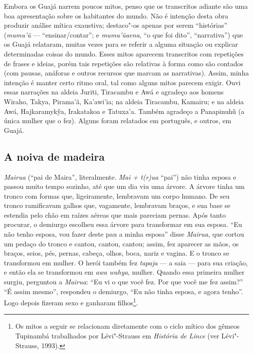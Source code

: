 Embora os Guajá narrem poucos mitos, penso que os transcritos adiante
são uma boa apresentação sobre os habitantes do mundo. Não é intenção
desta obra produzir análise mítica exaustiva; destaco"-os apenas por
serem ``histórias'' (\emph{mumu'ũ} --- ``ensinar/contar''; e
\emph{mumu'ũaena}, ``o que foi dito'', ``narrativa'') que os Guajá
relataram, muitas vezes para se referir a alguma situação ou explicar
determinadas coisas do mundo. Esses mitos aparecem transcritos com
repetições de frases e ideias, porém tais repetições são relativas à
forma como são contados (com pausas, anáforas e outros recursos que
marcam as narrativas). Assim, minha intenção é manter certo ritmo oral,
tal como alguns mitos parecem exigir. Ouvi essas narrações na aldeia
Juriti, Tiracambu e Awá e agradeço aos homens Wiraho, Takya, Pirama'ã,
Ka'awi'ia; na aldeia Tiracambu, Kamairu; e na aldeia Awá,
Hajkaramykỹa, Irakatakoa e Tatuxa'a. Também agradeço a Panapinuhũ (a
única mulher que o fez). Alguns foram relatados em português, e outros,
em Guajá.

\subsection{A noiva de madeira}

\forceindent\emph{Mairua} (``pai de Maira'', literalmente. \emph{Mai + t(r)ua} ``pai'')
não tinha esposa e passou muito tempo sozinho, até que um dia viu uma
árvore. A árvore tinha um tronco com formas que, ligeiramente, lembravam
um corpo humano. De seu tronco ramificavam galhos que, vagamente,
lembravam braços, e sua base se estendia pelo chão em raízes aéreas que
mais pareciam pernas. Após tanto procurar, o demiurgo escolheu essa
árvore para transformar em sua esposa. ``Eu não tenho esposa, vou fazer
deste pau a minha esposa'' disse \emph{Mairua}, que cortou um pedaço do
tronco e cantou, cantou, cantou; assim, fez aparecer as mãos, os braços,
seios, pés, pernas, cabeça, olhos, boca, nariz e vagina. E o tronco se
transformou em mulher. O herói também fez \emph{tapaja} --- a saia --- para
sua criação, e então ela se transformou em \emph{awa wahya}, mulher.
Quando essa primeira mulher surgiu, perguntou a \emph{Mairua}: ``Eu vi o
que você fez. Por que você me fez assim?'' ``É assim mesmo'', respondeu o
demiurgo, ``Eu não tinha esposa, e agora tenho''. Logo depois fizeram sexo
e ganharam filhos\footnote{Os mitos a seguir se relacionam diretamente
  com o ciclo mítico dos gêmeos Tupinambá trabalhados por Lévi"-Strauss
  em \emph{História de Lince} (ver Lévi"-Strauss, 1993).}.

